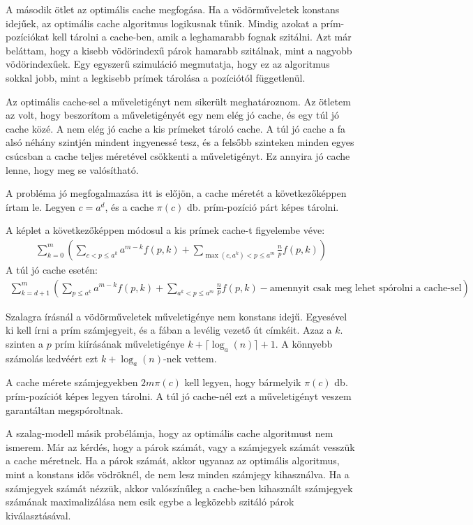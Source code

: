 \documentclass{article}
\begin{document}
A második ötlet az optimális cache megfogása.
Ha a vödörműveletek konstans idejűek, az optimális cache algoritmus logikusnak tűnik. Mindig azokat a prím-pozíciókat kell tárolni a cache-ben, amik a leghamarabb fognak szitálni.
Azt már beláttam, hogy a kisebb vödörindexű párok hamarabb szitálnak, mint a nagyobb vödörindexűek. Egy egyszerű szimuláció megmutatja, hogy ez az algoritmus sokkal jobb, mint a legkisebb prímek tárolása a pozíciótól függetlenül.

Az optimális cache-sel a műveletigényt nem sikerült meghatároznom. Az ötletem az volt, hogy beszorítom a műveletigényét egy nem elég jó cache, és egy túl jó cache közé.
A nem elég jó cache a kis prímeket tároló cache.
A túl jó cache a fa alsó néhány szintjén mindent ingyenessé tesz, és a felsőbb szinteken minden egyes csúcsban a cache teljes méretével csökkenti a műveletigényt.
Ez annyira jó cache lenne, hogy meg se valósítható.

A probléma jó megfogalmazása itt is előjön, a cache méretét a következőképpen írtam le. Legyen  $c=a^d$, és a cache $\pi(c)$ db. prím-pozíció párt képes tárolni.

A képlet a következőképpen módosul a kis prímek cache-t figyelembe véve:
\begin{align*}
\sum_{k=0}^{m} \left( \sum_{ c < p \le a^k} a^{m-k} f(p, k) + \sum_{\max(c, a^k) < p \le a^m} \frac{n}{p} f(p, k) \right)
\end{align*}
A túl jó cache esetén:
\begin{align*}
\sum_{k=d+1}^{m} \left( \sum_{ p \le a^k} a^{m-k} f(p, k) + \sum_{a^k < p \le a^m} \frac{n}{p} f(p, k) - \text{amennyit csak meg lehet spórolni a cache-sel} \right)
\end{align*}

Szalagra írásnál a vödörműveletek műveletigénye nem konstans idejű.
Egyesével ki kell írni a prím számjegyeit, és a fában a levélig vezető út címkéit.
Azaz a $k$. szinten a $p$ prím kiírásának műveletigénye $k+\lceil\log_{a}(n)\rceil+1$.
A könnyebb számolás kedvéért ezt $k+\log_{a}(n)$-nek vettem.

A cache mérete számjegyekben $2m\pi(c)$ kell legyen, hogy bármelyik $\pi(c)$ db. prím-pozíciót képes legyen tárolni. A túl jó cache-nél ezt a műveletigényt veszem garantáltan megspóroltnak.

A szalag-modell másik probélámja, hogy az optimális cache algoritmust nem ismerem.
Már az kérdés, hogy a párok számát, vagy a számjegyek számát vesszük a cache méretnek.
Ha a párok számát, akkor ugyanaz az optimális algoritmus, mint a konstans idős vödröknél, de nem lesz minden számjegy kihasználva.
Ha a számjegyek számát nézzük, akkor valószínűleg a cache-ben kihasznált számjegyek számának maximalizálása nem esik egybe a legközebb szitáló párok kiválasztásával.
\end{document}
